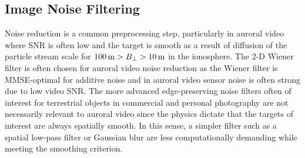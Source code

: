 \FloatBarrier
\subsection{Image Noise Filtering}\label{sec:filtnoise}
Noise reduction is a common preprocessing step, particularly in auroral video where SNR is often low and the target is smooth as a result of diffusion of the particle stream scale for $\unit[100]{m} > B_\perp > \unit[10]{m}$ in the ionosphere.
The 2-D Wiener filter is often chosen for auroral video noise reduction as the Wiener filter is MMSE-optimal for additive noise \citep{vaseghi2000} and in auroral video sensor noise is often strong due to low video SNR.
The more advanced edge-preserving noise filters often of interest for terrestrial objects in commercial and personal photography are not necessarily relevant to auroral video since the physics dictate that the targets of interest are always spatially smooth.
In this sense, a simpler filter such as a spatial low-pass filter or Gaussian blur are less computationally demanding while meeting the smoothing criterion.

